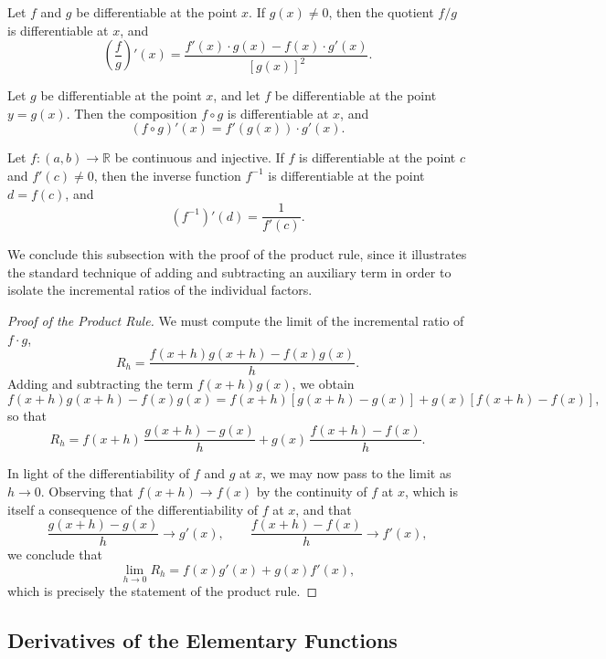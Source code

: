\begin{theorem}
Let $f$ and $g$ be differentiable at the point $x$. If $g(x) \neq 0$, then the quotient $f/g$ is differentiable at $x$, and
\[
\left( \frac{f}{g} \right)'(x) = \frac{f'(x) \cdot g(x) - f(x) \cdot g'(x)}{[g(x)]^2}.
\]

\end{theorem}

\begin{theorem}
Let $g$ be differentiable at the point $x$, and let $f$ be differentiable at the point $y = g(x)$. Then the composition $f \circ g$ is differentiable at $x$, and
\[
(f \circ g)'(x) = f'(g(x)) \cdot g'(x).
\]

\end{theorem}

\begin{theorem}
Let $f : (a,b) \to \mathbb{R}$ be continuous and injective. If $f$ is differentiable at the point $c$ and $f'(c) \neq 0$, then the inverse function $f^{-1}$ is differentiable at the point $d = f(c)$, and
\[
(f^{-1})'(d) = \frac{1}{f'(c)}.
\]

\end{theorem}

We conclude this subsection with the proof of the product rule, since it illustrates the standard technique of adding and subtracting an auxiliary term in order to isolate the incremental ratios of the individual factors.

\begin{proof}[Proof of the Product Rule]
We must compute the limit of the incremental ratio of $f \cdot g$,
\[
R_h = \frac{f(x+h) g(x+h) - f(x) g(x)}{h}.
\]
Adding and subtracting the term $f(x+h) g(x)$, we obtain
\[
f(x+h) g(x+h) - f(x) g(x) = f(x+h) [g(x+h) - g(x)] + g(x) [f(x+h) - f(x)],
\]
so that
\[
R_h = f(x+h) \, \frac{g(x+h) - g(x)}{h} + g(x) \, \frac{f(x+h) - f(x)}{h}.
\]

In light of the differentiability of $f$ and $g$ at $x$, we may now pass to the limit as $h \to 0$. Observing that $f(x+h) \to f(x)$ by the continuity of $f$ at $x$, which is itself a consequence of the differentiability of $f$ at $x$, and that
\[
\frac{g(x+h) - g(x)}{h} \to g'(x), \qquad \frac{f(x+h) - f(x)}{h} \to f'(x),
\]
we conclude that
\[
\lim_{h \to 0} R_h = f(x) g'(x) + g(x) f'(x),
\]
which is precisely the statement of the product rule.
\end{proof}

\subsection{Derivatives of the Elementary Functions}

